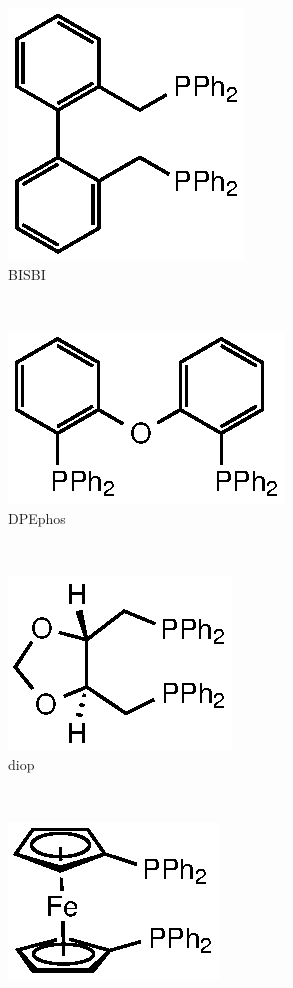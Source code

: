 \begin{figure}[htbp]
~
\begin{subfigure}[b]{0.3\textwidth}
	\centering
	\includegraphics{../Figures/Diphosphines/BISBI.eps}
	\caption{BISBI}
	\label{BISBI}
\end{subfigure}
~
\begin{subfigure}[b]{0.3\textwidth}
	\centering
	\includegraphics{../Figures/Xantphosderivatives/DPEphos.eps}
	\caption{DPEphos}
	\label{DPEphosB}
\end{subfigure}
\\
\vspace{0.5cm}
\begin{subfigure}[b]{0.3\textwidth}
	\centering
	\includegraphics{../Figures/Diphosphines/DIOP.eps}
	\caption{diop}
	\label{diop}
\end{subfigure}
~
\begin{subfigure}[b]{0.3\textwidth}
	\centering
	\includegraphics{../Figures/Diphosphines/dppf.eps}

\end{subfigure}
\end{figure}
